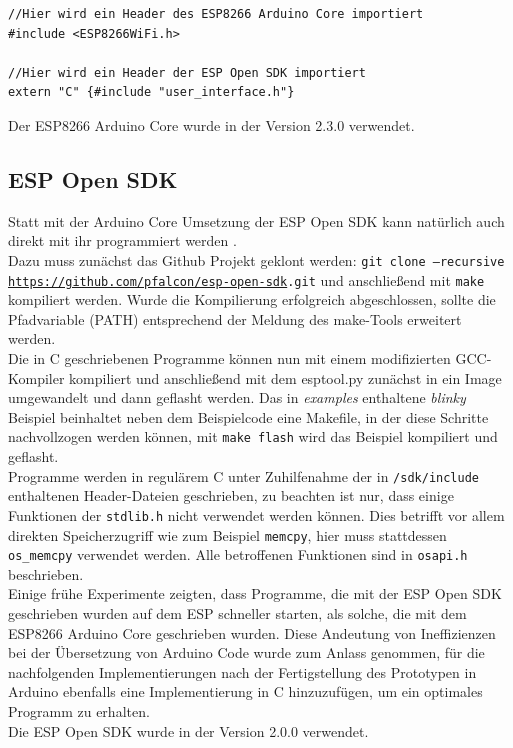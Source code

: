 \begin{verbatim}
//Hier wird ein Header des ESP8266 Arduino Core importiert
#include <ESP8266WiFi.h> 

//Hier wird ein Header der ESP Open SDK importiert
extern "C" {#include "user_interface.h"} 
\end{verbatim}

Der ESP8266 Arduino Core wurde in der Version 2.3.0 verwendet.

\subsection{ESP Open SDK}
Statt mit der Arduino Core Umsetzung der ESP Open SDK kann natürlich auch direkt mit ihr programmiert werden \cite{esp2017open}. \\
Dazu muss zunächst das Github Projekt geklont werden: \texttt{git clone --recursive \url{https://github.com/pfalcon/esp-open-sdk}.git} und anschließend mit \texttt{make} kompiliert werden.
Wurde die Kompilierung erfolgreich abgeschlossen, sollte die Pfadvariable (PATH) entsprechend der Meldung des make-Tools erweitert werden. \\
Die in C geschriebenen Programme können nun mit einem modifizierten GCC-Kompiler kompiliert und anschließend mit dem esptool.py zunächst in ein Image umgewandelt und dann geflasht werden. 
Das in \textit{examples} enthaltene \textit{blinky} Beispiel beinhaltet neben dem Beispielcode eine Makefile, in der diese Schritte nachvollzogen werden können, mit \texttt{make flash} wird das Beispiel kompiliert und geflasht. \\
Programme werden in regulärem C unter Zuhilfenahme der in \texttt{/sdk/include} enthaltenen Header-Dateien geschrieben, zu beachten ist nur, dass einige Funktionen der \texttt{stdlib.h} nicht verwendet werden können.
Dies betrifft vor allem direkten Speicherzugriff wie zum Beispiel \texttt{memcpy}, hier muss stattdessen \texttt{os\_memcpy} verwendet werden.
Alle betroffenen Funktionen sind in \texttt{osapi.h} beschrieben. \\
Einige frühe Experimente zeigten, dass Programme, die mit der ESP Open SDK geschrieben wurden auf dem ESP schneller starten, als solche, die mit dem ESP8266 Arduino Core geschrieben wurden.
Diese Andeutung von Ineffizienzen bei der Übersetzung von Arduino Code wurde zum Anlass genommen, für die nachfolgenden Implementierungen nach der Fertigstellung des Prototypen in Arduino ebenfalls eine Implementierung in C hinzuzufügen, um ein optimales Programm zu erhalten. \\
Die ESP Open SDK wurde in der Version 2.0.0 verwendet.

